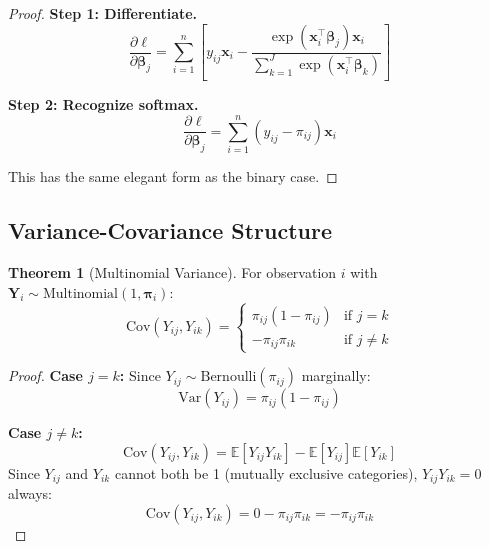 \documentclass[11pt,letterpaper]{article}
\theoremstyle{definition}
\newtheorem{theorem}{Theorem}[section]
\newcommand{\E}{\mathbb{E}}
\newcommand{\Var}{\mathrm{Var}}
\newcommand{\Cov}{\mathrm{Cov}}
\newcommand{\bb}{\boldsymbol{\beta}}
\newcommand{\pp}{\boldsymbol{\pi}}
\begin{document}
\begin{proof}
\textbf{Step 1: Differentiate.}
\begin{equation}
    \frac{\partial \ell}{\partial \bb_j} = \sum_{i=1}^{n} \left[ y_{ij} \mathbf{x}_i - \frac{\exp(\mathbf{x}_i^\top \bb_j) \mathbf{x}_i}{\sum_{k=1}^{J} \exp(\mathbf{x}_i^\top \bb_k)} \right]
\end{equation}

\textbf{Step 2: Recognize softmax.}
\begin{equation}
    \frac{\partial \ell}{\partial \bb_j} = \sum_{i=1}^{n} (y_{ij} - \pi_{ij}) \mathbf{x}_i
\end{equation}

This has the same elegant form as the binary case.
\end{proof}

\subsection{Variance-Covariance Structure}

\begin{theorem}[Multinomial Variance]
For observation $i$ with $\mathbf{Y}_i \sim \text{Multinomial}(1, \pp_i)$:
\begin{equation}
    \Cov(Y_{ij}, Y_{ik}) = \begin{cases}
        \pi_{ij}(1-\pi_{ij}) & \text{if } j = k \\
        -\pi_{ij}\pi_{ik} & \text{if } j \neq k
    \end{cases}
    \label{eq:multinom-cov}
\end{equation}
\end{theorem}

\begin{proof}
\textbf{Case $j = k$:}
Since $Y_{ij} \sim \text{Bernoulli}(\pi_{ij})$ marginally:
\begin{equation}
    \Var(Y_{ij}) = \pi_{ij}(1-\pi_{ij})
\end{equation}

\textbf{Case $j \neq k$:}
\begin{equation}
    \Cov(Y_{ij}, Y_{ik}) = \E[Y_{ij}Y_{ik}] - \E[Y_{ij}]\E[Y_{ik}]
\end{equation}
Since $Y_{ij}$ and $Y_{ik}$ cannot both be 1 (mutually exclusive categories), $Y_{ij}Y_{ik} = 0$ always:
\begin{equation}
    \Cov(Y_{ij}, Y_{ik}) = 0 - \pi_{ij}\pi_{ik} = -\pi_{ij}\pi_{ik}
\end{equation}
\end{proof}
\end{document}
